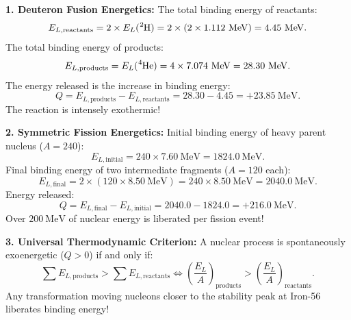\begin{solution}
\textbf{1. Deuteron Fusion Energetics:}
The total binding energy of reactants:
\[
E_{L,\text{reactants}} = 2 \times E_L(\ce{^{2}H}) = 2 \times (2 \times 1.112\ \mathrm{MeV}) = 4.45\ \mathrm{MeV}.
\]
The total binding energy of products:
\[
E_{L,\text{products}} = E_L(\ce{^{4}He}) = 4 \times 7.074\ \mathrm{MeV} = 28.30\ \mathrm{MeV}.
\]
The energy released is the increase in binding energy:
\[
Q = E_{L,\text{products}} - E_{L,\text{reactants}} = 28.30 - 4.45 = \mathbf{+23.85\ \mathrm{MeV}}.
\]
The reaction is intensely exothermic!

\textbf{2. Symmetric Fission Energetics:}
Initial binding energy of heavy parent nucleus ($A = 240$):
\[
E_{L,\text{initial}} = 240 \times 7.60\ \mathrm{MeV} = 1824.0\ \mathrm{MeV}.
\]
Final binding energy of two intermediate fragments ($A = 120$ each):
\[
E_{L,\text{final}} = 2 \times (120 \times 8.50\ \mathrm{MeV}) = 240 \times 8.50\ \mathrm{MeV} = 2040.0\ \mathrm{MeV}.
\]
Energy released:
\[
Q = E_{L,\text{final}} - E_{L,\text{initial}} = 2040.0 - 1824.0 = \mathbf{+216.0\ \mathrm{MeV}}.
\]
Over $200\ \mathrm{MeV}$ of nuclear energy is liberated per fission event!

\textbf{3. Universal Thermodynamic Criterion:}
A nuclear process is spontaneously exoenergetic ($Q > 0$) if and only if:
\[
\sum E_{L,\text{products}} > \sum E_{L,\text{reactants}} \iff \left(\frac{E_L}{A}\right)_{\text{products}} > \left(\frac{E_L}{A}\right)_{\text{reactants}}.
\]
Any transformation moving nucleons closer to the stability peak at Iron-56 liberates binding energy!
\end{solution}

